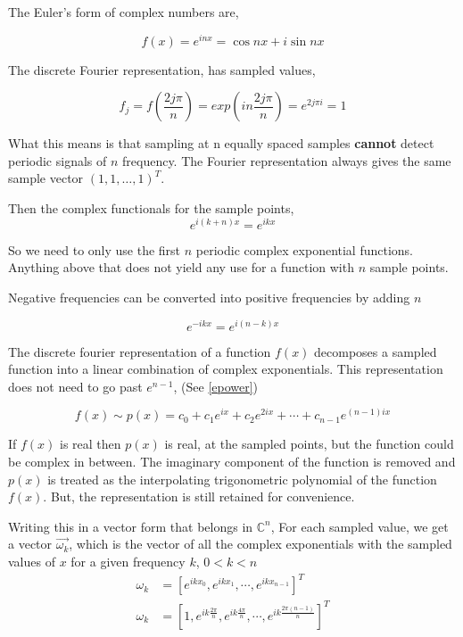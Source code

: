 \documentclass[twoside]{article}
\begin{document}
The Euler's form of complex numbers are,

\[
	f(x) = e^{inx} = \cos{nx} + i \sin{nx}
\]


The discrete Fourier representation, has sampled values,

\[
	f_j = f(\frac{2j \pi}{n}) = exp(in \frac{2j\pi}{n}) = e^{2j\pi i} = 1
\]

What this means is that sampling at n equally spaced samples \textbf{cannot} detect periodic signals of $n$ frequency. The Fourier representation always gives the same sample vector $(1,1,\dots, 1)^T$. 

Then the complex functionals for the sample points,
\begin{equation}
\label{epower}e^{i(k+n)x} = e^{ikx}
\end{equation}



So we need to only use the first $n$ periodic complex exponential functions. Anything above that does not yield any use for a function with $n$ sample points.

Negative frequencies can be converted into positive frequencies by adding $n$

\[
	e^{-ikx} = e^{i(n-k)x}
\]

The discrete fourier representation of a function $f(x)$ decomposes a sampled function into a linear combination of complex exponentials. This representation does not need to go past $e^{n-1}$, (See \ref{epower})

\[
	f(x) \sim p(x) = c_0 + c_1 e^{ix} + c_2 e^{2ix} + \cdots + c_{n-1}e^{(n-1)ix}
\]
\begin{note}
	If $f(x)$ is real then $p(x)$ is real, at the sampled points, but the function could be complex in between. The imaginary component of the function is removed and $p(x)$ is treated as the interpolating trigonometric polynomial of the function $f(x)$. But, the representation is still retained for convenience.
\end{note}

Writing this in a vector form that belongs in $\mathbb{C}^n$, For each sampled value, we get a vector $\vec{\omega_k}$, which is the vector of all the complex exponentials with the sampled values of $x$ for a given frequency $k$, $0 < k < n$
\begin{align*}
	\omega_k &= [e^{i k x_0},e^{ik x_1},\cdots,e^{ik x_{n-1}}]^T \\
	\omega_k &= [1,e^{i k \frac{2\pi}{n}},e^{ik \frac{4\pi}{n}},\cdots,e^{ik \frac{2\pi(n-1)}{n}}]^T \\
\end{align*}
\end{document}
